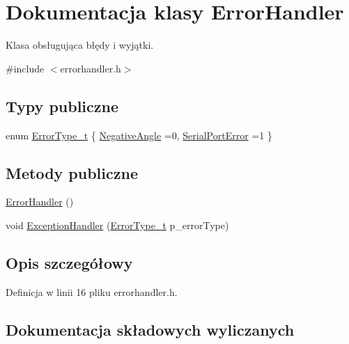 \hypertarget{class_error_handler}{}\section{Dokumentacja klasy Error\+Handler}
\label{class_error_handler}


Klasa obsługująca błędy i wyjątki.  




{\ttfamily \#include $<$errorhandler.\+h$>$}

\subsection*{Typy publiczne}
\begin{DoxyCompactItemize}
\item 
enum \hyperlink{class_error_handler_aee61709d471d61ec7d1069369565b59a}{Error\+Type\+\_\+t} \{ \hyperlink{class_error_handler_aee61709d471d61ec7d1069369565b59aa1ecd3180072ace794160f0cfcfea9458}{Negative\+Angle} =0, 
\hyperlink{class_error_handler_aee61709d471d61ec7d1069369565b59aac9084d70b57995fc2e17dd81033c08b6}{Serial\+Port\+Error} =1
 \}
\end{DoxyCompactItemize}
\subsection*{Metody publiczne}
\begin{DoxyCompactItemize}
\item 
\hyperlink{class_error_handler_a7e5f379bd231442b898cef94556b2107}{Error\+Handler} ()
\item 
void \hyperlink{class_error_handler_a418fa4905c14ec2682fffc2c956afa4a}{Exception\+Handler} (\hyperlink{class_error_handler_aee61709d471d61ec7d1069369565b59a}{Error\+Type\+\_\+t} p\+\_\+error\+Type)
\end{DoxyCompactItemize}


\subsection{Opis szczegółowy}


Definicja w linii 16 pliku errorhandler.\+h.



\subsection{Dokumentacja składowych wyliczanych}
\mbox{\label{class_error_handler_aee61709d471d61ec7d1069369565b59a}} 
